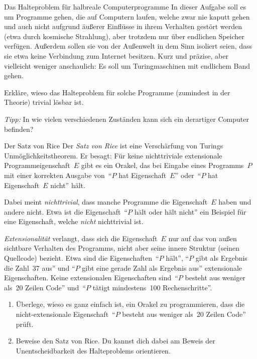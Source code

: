\documentclass[twoside]{../zirkelblatt1415}
\theoremstyle{definition}
\theoremstyle{plain}
\theoremstyle{remark}
\begin{document}
\begin{aufgabe}{Das Halteproblem für halbreale Computerprogramme}
In dieser Aufgabe soll es um Programme gehen, die auf Computern laufen, welche
zwar nie kaputt gehen und auch nicht aufgrund äußerer Einflüsse in ihrem
Verhalten gestört werden (etwa durch kosmische Strahlung), aber trotzdem nur
über endlichen Speicher verfügen. Außerdem sollen sie von der Außenwelt in dem
Sinn isoliert seien, dass sie etwa keine Verbindung zum Internet besitzen.
Kurz und präzise, aber vielleicht weniger anschaulich: Es soll um
Turingmaschinen mit endlichem Band gehen.

Erkläre, wieso das Halteproblem für solche Programme (zumindest in der
Theorie) trivial lösbar ist.

\emph{Tipp:} In wie vielen verschiedenen Zuständen kann sich ein derartiger
Computer befinden?
\end{aufgabe}

\begin{aufgabe}{Der Satz von Rice}
Der \emph{Satz von Rice} ist eine Verschärfung von Turings
Unmöglichkeitstheorem. Er besagt: Für keine nichttriviale extensionale
Programmeigenschaft~$E$ gibt es ein Orakel, das bei Eingabe
eines Programms~$P$ mit einer korrekten Ausgabe von~"`$P$ hat Eigenschaft~$E$"'
oder~"`$P$ hat Eigenschaft~$E$ nicht"' hält.

Dabei meint \emph{nichttrivial}, dass manche Programme die Eigenschaft~$E$
haben und andere nicht. Etwa ist die Eigenschaft~"`$P$ hält oder hält nicht"'
ein Beispiel für eine Eigenschaft, welche \emph{nicht} nichttrivial ist.

\emph{Extensionalität} verlangt, dass sich die Eigenschaft~$E$ nur auf das von
außen sichtbare Verhalten des Programms, nicht aber seine innere Struktur
(seinen Quellcode) bezieht. Etwa sind die Eigenschaften~"`$P$ hält"',
"`$P$ gibt als Ergebnis die Zahl~37 aus"' und "`$P$ gibt eine gerade Zahl als
Ergebnis aus"' extensionale Eigenschaften. Keine extensionalen Eigenschaften
sind~"`$P$ besteht aus weniger als~20 Zeilen Code"' und~"`$P$ tätigt
mindestens~100 Rechenschritte"'.

\begin{enumerate}
\item Überlege, wieso es ganz einfach ist, ein Orakel zu programmieren, dass
die nicht-extensionale Eigenschaft~"`$P$ besteht aus weniger als~20 Zeilen
Code"' prüft.
\item Beweise den Satz von Rice. Du kannst dich dabei am Beweis der
Unentscheidbarkeit des Halteproblems orientieren.
\end{enumerate}\fixlistspacing
\end{aufgabe}
\end{document}
